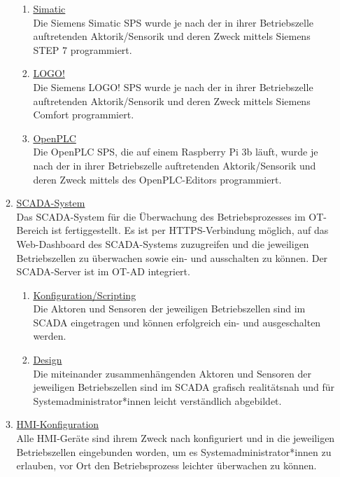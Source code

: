 \documentclass[
	headings=optiontotocandhead,%
	oneside,
	numbers=noenddot,%
	toc=flat, %
	10pt, %
	parskip=full, %
	listof=totoc, %
	listof=flat, %
	numbers=noenddot, %
	bibliography=totoc, %
	a4paper,DIV=14,
]{scrartcl}
\begin{document}
\begin{enumerate}[start=1,label={\bfseries Ziel-H \arabic*},leftmargin=*,wide]
\begin{enumerate}[label=\alph*.]
\begin{enumerate}[label=\roman*.]
\item{\underline{Simatic}}\\
Die Siemens Simatic SPS wurde je nach der in ihrer Betriebszelle auftretenden Aktorik/Sensorik und deren Zweck mittels Siemens STEP 7 programmiert.

\item{\underline{LOGO!}}\\
Die Siemens LOGO! SPS wurde je nach der in ihrer Betriebszelle auftretenden Aktorik/Sensorik und deren Zweck mittels Siemens Comfort programmiert.

\item{\underline{OpenPLC}}\\
Die OpenPLC SPS, die auf einem Raspberry Pi 3b läuft, wurde je nach der in ihrer Betriebszelle auftretenden Aktorik/Sensorik und deren Zweck mittels des OpenPLC-Editors programmiert.
\end{enumerate}

\item{\underline{SCADA-System}}\\
Das SCADA-System für die Überwachung des Betriebsprozesses im OT-Bereich ist fertiggestellt. Es ist per HTTPS-Verbindung möglich, auf das Web-Dashboard des SCADA-Systems zuzugreifen und die jeweiligen Betriebszellen zu überwachen sowie ein- und ausschalten zu können. Der SCADA-Server ist im OT-AD integriert.

\begin{enumerate}[label=\roman*.]
\item{\underline{Konfiguration/Scripting}}\\
Die Aktoren und Sensoren der jeweiligen Betriebszellen sind im SCADA eingetragen und können erfolgreich ein- und ausgeschalten werden.

\item{\underline{Design}}\\
Die miteinander zusammenhängenden Aktoren und Sensoren der jeweiligen Betriebszellen sind im SCADA grafisch realitätsnah und für Systemadministrator*innen leicht verständlich abgebildet.
\end{enumerate}

\item{\underline{HMI-Konfiguration}}\\
Alle HMI-Geräte sind ihrem Zweck nach konfiguriert und in die jeweiligen Betriebszellen eingebunden worden, um es Systemadministrator*innen zu erlauben, vor Ort den Betriebsprozess leichter überwachen zu können.


\end{enumerate}
\end{enumerate}
\end{document}
